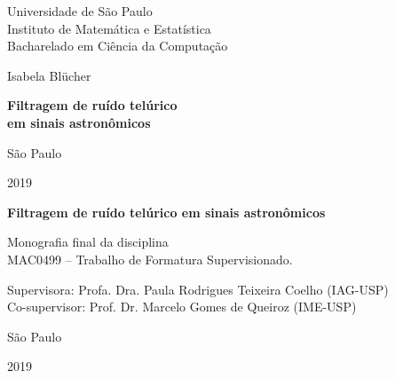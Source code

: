 \documentclass[12pt,twoside,a4paper]{book}
\begin{document}
\frontmatter 
\fancyhead[RO]{{\footnotesize\rightmark}\hspace{2em}\thepage}
\setcounter{tocdepth}{2}
\fancyhead[LE]{\thepage\hspace{2em}\footnotesize{\leftmark}}
\fancyhead[RE,LO]{}
\fancyhead[RO]{{\footnotesize\rightmark}\hspace{2em}\thepage}

\onehalfspacing  %

\thispagestyle{empty}
\begin{center}
    \vspace*{2.3cm}
    Universidade de São Paulo\\
    Instituto de Matemática e Estatística\\
    Bacharelado em Ciência da Computação


    \vspace*{3cm}
    \Large{Isabela Blücher}
    

    \vspace{3cm}
    \textbf{\Large{Filtragem de ruído telúrico \\
    em sinais astronômicos}}
    
       
    \vskip 5cm
    \normalsize{São Paulo}

    \normalsize{2019}
\end{center}

%
\newpage
\thispagestyle{empty}
    \begin{center}
        \vspace*{2.3 cm}
        \textbf{\Large{Filtragem de ruído telúrico em sinais astronômicos}}
        \vspace*{2 cm}
    \end{center}

    \vskip 2cm

    \begin{flushright}
	Monografia final da disciplina \\
        MAC0499 -- Trabalho de Formatura Supervisionado.
    \end{flushright}

    \vskip 5cm

    \begin{center}
    Supervisora: Profa. Dra. Paula Rodrigues Teixeira Coelho (IAG-USP)\\
    Co-supervisor: Prof. Dr. Marcelo Gomes de Queiroz (IME-USP)

    \vskip 5cm
    \normalsize{São Paulo}

    \normalsize{2019}
    \end{center}
\pagebreak
\end{document}

